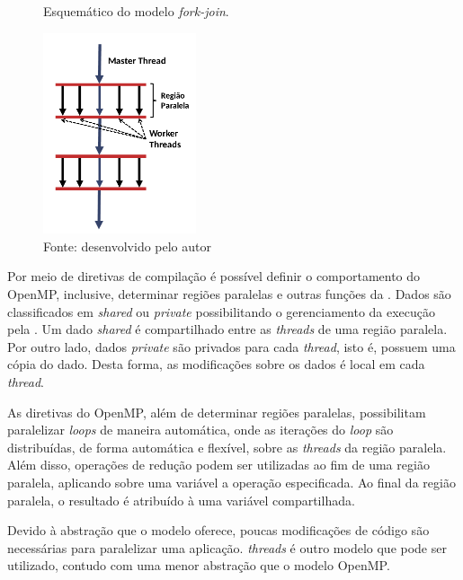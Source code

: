 \begin{figure}
	\centering
	\caption{Esquemático do modelo \textit{fork-join}.}
	\includegraphics[width=0.4\textwidth]{figs/forkjoin.pdf}
    \caption*{Fonte: desenvolvido pelo autor}
	\label{fig:forkjoin}
\end{figure}

Por meio de diretivas de compilação é possível definir o comportamento do
OpenMP, inclusive, determinar regiões paralelas e outras funções da \api.
Dados são classificados em \textit{shared} ou \textit{private} possibilitando
o gerenciamento da execução pela \api. Um dado \textit{shared} é compartilhado
entre as \textit{threads} de uma região paralela. Por outro lado, dados
\textit{private} são privados para cada \textit{thread}, isto é, possuem uma
cópia do dado. Desta forma, as modificações sobre os dados é local em cada
\textit{thread}.

As diretivas do OpenMP, além de determinar regiões paralelas, possibilitam
paralelizar \textit{loops} de maneira automática, onde as iterações
do \textit{loop} são distribuídas, de forma automática e flexível, sobre as
\textit{threads} da região paralela. Além disso, operações de redução podem ser
utilizadas ao fim de uma região paralela, aplicando sobre uma variável a
operação especificada. Ao final da região paralela, o resultado é atribuído à
uma variável compartilhada.

Devido à abstração que o modelo oferece, poucas modificações de código são
necessárias para paralelizar uma aplicação. \posix \textit{threads} é outro
modelo que pode ser utilizado, contudo com uma menor abstração que o modelo
OpenMP.

